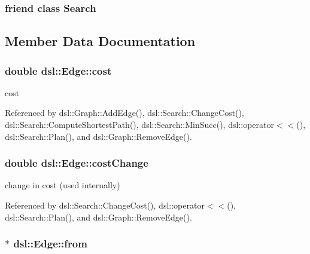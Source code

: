 \subsubsection[{Search}]{\setlength{\rightskip}{0pt plus 5cm}friend class {\bf Search}\hspace{0.3cm}{\ttfamily [friend]}}\label{classdsl_1_1Edge_aea88561fddd2e924cebf793f0cfdc8b6}


\subsection{Member Data Documentation}
\subsubsection[{cost}]{\setlength{\rightskip}{0pt plus 5cm}double dsl\-::\-Edge\-::cost}\label{classdsl_1_1Edge_a2118fb06bf1a19ceffa4303caf41fc14}


cost 



Referenced by dsl\-::\-Graph\-::\-Add\-Edge(), dsl\-::\-Search\-::\-Change\-Cost(), dsl\-::\-Search\-::\-Compute\-Shortest\-Path(), dsl\-::\-Search\-::\-Min\-Succ(), dsl\-::operator$<$$<$(), dsl\-::\-Search\-::\-Plan(), and dsl\-::\-Graph\-::\-Remove\-Edge().

\subsubsection[{cost\-Change}]{\setlength{\rightskip}{0pt plus 5cm}double dsl\-::\-Edge\-::cost\-Change}\label{classdsl_1_1Edge_a509db0804dbae524bc34cf89a53183fb}


change in cost (used internally) 



Referenced by dsl\-::\-Search\-::\-Change\-Cost(), dsl\-::operator$<$$<$(), dsl\-::\-Search\-::\-Plan(), and dsl\-::\-Graph\-::\-Remove\-Edge().

\subsubsection[{from}]{$\ast$ dsl\-::\-Edge\-::from}\label{classdsl_1_1Edge_a90a355b5bf47c67fcb20f795d88ef5e3}


